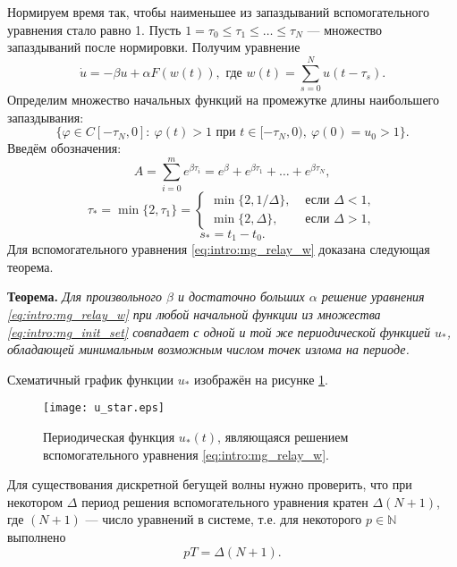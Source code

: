 Нормируем время так, чтобы наименьшее из запаздываний вспомогательного уравнения стало равно 1. Пусть $1 = \tau_0 \leq \tau_1 \leq \ldots \leq \tau_N$ --- множество запаздываний после нормировки. Получим уравнение 
\begin{equation}
	\label{eq:intro:mg_relay_w}
	\dot{u}=-\beta u+\alpha F(w(t)), \text{ где } w(t) = \sum\limits_{s = 0}^N u(t - \tau_s).
\end{equation}
%
Определим множество начальных функций на промежутке длины наибольшего запаздывания: 
%
\begin{equation}
	\label{eq:intro:mg_init_set}
	\{\varphi\in C[-\tau_{N},0]:\  \varphi(t)>1 \text{ при } t\in[-\tau_{N},0),\ \varphi(0)=u_0 > 1\}.
\end{equation}
%
Введём обозначения:
%
\begin{equation*}
	A = \sum_{i=0}^{m}e^{\beta \tau_{i}}=e^\beta+e^{\beta \tau_1}+\ldots+e^{\beta \tau_{N}},
\end{equation*}
\begin{equation*}
	\tau_* = \min\{2,\tau_1\}=\left\lbrace\begin{array}{cl}
		\min\{2,1/\Delta\}, & \text{ если } \Delta < 1,
		\\
		\min\{2,\Delta\}, & \text{ если } \Delta > 1,
	\end{array}\right.
\end{equation*}
\begin{equation*}
	s_* = t_1-t_0.
\end{equation*}
%
Для вспомогательного уравнения \eqref{eq:intro:mg_relay_w} доказана следующая теорема.

\textbf{Теорема.} \textit{Для произвольного $\beta$ и достаточно больших $\alpha$ решение уравнения \eqref{eq:intro:mg_relay_w} при любой начальной функции из множества \eqref{eq:intro:mg_init_set} совпадает с одной и той же периодической функцией $u_*$, обладающей минимальным возможным числом точек излома на периоде.}

Схематичный график функции $u_*$ изображён на рисунке \ref{fig:intro:u_star}.

\begin{figure}[h]
	\centering
	\texttt{[image: u\_star.eps]}
	\caption{Периодическая функция $u_*(t)$, являющаяся решением вспомогательного уравнения \eqref{eq:intro:mg_relay_w}.}
	\label{fig:intro:u_star}
\end{figure}

Для существования дискретной бегущей волны нужно проверить, что при некотором $\Delta$ период решения вспомогательного уравнения кратен $\Delta (N + 1)$, где $(N + 1)$ --- число уравнений в системе, т.е. для некоторого $p \in \mathbb{N}$ выполнено
\begin{equation}
	\label{eq:intro:period_eq}
	pT = \Delta (N + 1).
\end{equation}


